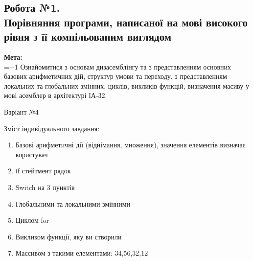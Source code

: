 \documentclass[a4paper,12pt]{article}
\begin{document}
\newpage
    \begin{center}
        \section*{\bfseries{Робота №1.\\
        Порівняння програми, написаної на мові 
        високого рівня з її компільованим виглядом
    }}
    \end{center}
    \textbf{Мета:} \\
    \hangindent=1.5cm 
    \hangafter=+1 \noindent
    Ознайомитися з основам дизасемблінгу та з представленням основних
    базових арифметичних дій, структур умови та переходу, з представленням
    локальних та глобальних змінних, циклів, викликів функцій, визначення масиву у
    мові асемблер в архітектурі ІА-32. \\
    \begin{center}
        \Large{Варіант №4}
    \end{center}
    Зміст індивідуального завдання:
    \begin{enumerate}
        \item Базові арифметичні дії (віднімання, множення), значення елементів
        визначає користувач
        \item if стейтмент рядок
        \item Switch на 3 пунктів
        \item Глобальними та локальними змінними
        \item Циклом for
        \item Викликом функції, яку ви створили
        \item Массивом з такими елементами: 34,56,32,12
    \end{enumerate}
\end{document}
